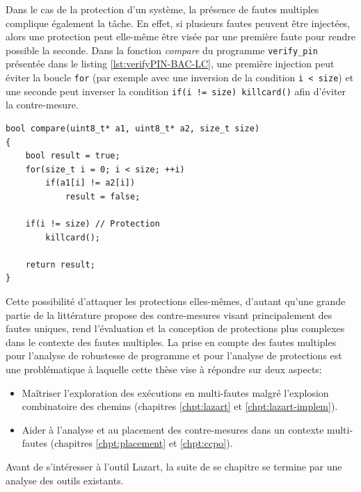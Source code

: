         Dans le cas de la protection d'un système, la présence de fautes multiples complique également la tâche. En effet, si plusieurs fautes peuvent être injectées, alors une protection peut elle-même être visée par une première faute pour rendre possible la seconde. Dans la fonction \textit{compare} du programme \texttt{verify\_pin} présentée dans le listing \ref{lst:verifyPIN-BAC-LC}, une première injection peut éviter la boucle \texttt{for} (par exemple avec une inversion de la condition \texttt{i < size}) et une seconde peut inverser la condition \texttt{if(i != size) killcard()} afin d'éviter la contre-mesure.
            
            
\begin{lstlisting}     
bool compare(uint8_t* a1, uint8_t* a2, size_t size)
{
    bool result = true;
    for(size_t i = 0; i < size; ++i)
        if(a1[i] != a2[i])
            result = false;
    
    if(i != size) // Protection
        killcard();
        
    return result;
}
\end{lstlisting}
    
        Cette possibilité d'attaquer les protections elles-mêmes, d'autant qu'une grande partie de la littérature propose des contre-mesures visant principalement des fautes uniques, rend l'évaluation et la conception de protections plus complexes dans le contexte des fautes multiples.
        La prise en compte des fautes multiples pour l'analyse de robustesse de programme et pour l'analyse de protections est une problématique à laquelle cette thèse vise à répondre sur deux aspects:
        
        \begin{itemize}
            \item Maîtriser l'exploration des exécutions en multi-fautes malgré l'explosion combinatoire des chemins (chapitres \ref{chpt:lazart} et \ref{chpt:lazart-implem}).
            \item Aider à l'analyse et au placement des contre-mesures dans un contexte multi-fautes (chapitres \ref{chpt:placement} et \ref{chpt:ccpo}).
        \end{itemize}
        
        Avant de s'intéresser à l'outil Lazart, la suite de se chapitre se termine par une analyse des outils existants.
            
    
    
    